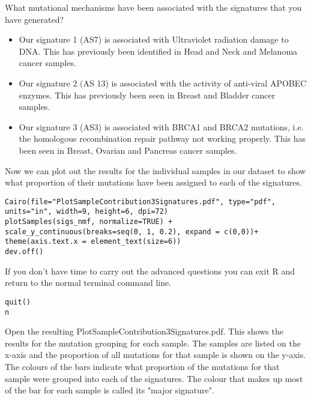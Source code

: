 \begin{questions}
What mutational mechanisms have been associated with the signatures that you have generated?
\end{questions}

\begin{answer}
\begin{itemize}
\item Our signature 1 (AS7) is associated with Ultraviolet radiation damage to DNA. This has previously been identified in Head and Neck and Melanoma cancer samples.
\item Our signature 2 (AS 13) is associated with the activity of anti-viral APOBEC enzymes. This has previously been seen in Breast and Bladder cancer samples.
\item Our signature 3 (AS3) is associated with BRCA1 and BRCA2 mutations, i.e. the homologous recombination repair pathway not working properly. This has been seen in Breast, Ovarian and Pancreas cancer samples.
\end{itemize}
\end{answer}

\begin{steps}
Now we can plot out the results for the individual samples in our dataset to show what proportion of their mutations have been assigned to each of the signatures.
\begin{lstlisting}
Cairo(file="PlotSampleContribution3Signatures.pdf", type="pdf", units="in", width=9, height=6, dpi=72)
plotSamples(sigs_nmf, normalize=TRUE) + scale_y_continuous(breaks=seq(0, 1, 0.2), expand = c(0,0))+ theme(axis.text.x = element_text(size=6))
dev.off()
\end{lstlisting}

If you don't have time to carry out the advanced questions you can
exit R and return to the normal terminal command line.
\begin{lstlisting}
quit()
n
\end{lstlisting}

Open the resulting PlotSampleContribution3Signatures.pdf.
\vspace{4 mm}
This shows the results for the mutation grouping for each sample.
The samples are listed on the x-axis and the proportion of all mutations for that sample is shown on the y-axis.
The colours of the bars indicate what proportion of the mutations for that sample were grouped into each of the signatures.
The colour that makes up most of the bar for each sample is called its "major signature".
\end{steps}

